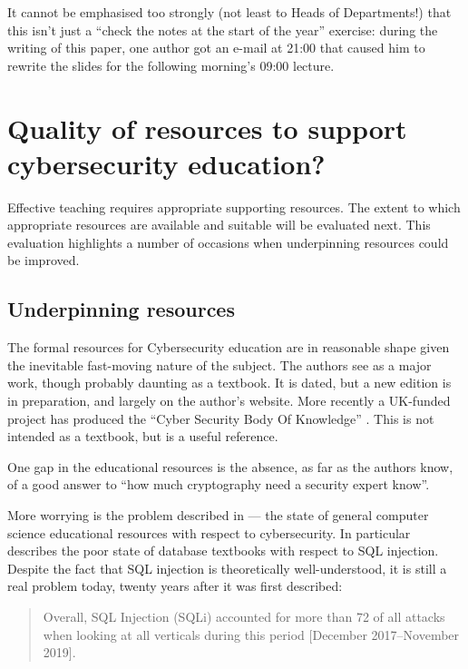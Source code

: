 \documentclass[conference]{IEEEtran}
\begin{document}
It cannot be emphasised too strongly (not least to Heads of Departments!) that this isn't just a ``check the notes at the start of the year'' exercise: during the writing of this paper, one author %
got an e-mail at 21:00 that caused him to rewrite the slides for the following morning's 09:00 lecture.


\section{Quality of resources to support cybersecurity education?}
Effective teaching requires appropriate supporting resources. The extent to which appropriate resources are available and suitable will be evaluated next. This evaluation highlights a number of occasions when underpinning resources could be improved. 
\subsection{Underpinning resources}
The formal resources for Cybersecurity education are in reasonable shape given the inevitable fast-moving nature of the subject. The authors see \cite{Anderson2008} as a major work, though probably daunting as a textbook. It is dated, but a new edition is in preparation, and largely on the author's website. More recently a UK-funded project has produced the ``Cyber Security Body Of Knowledge'' \cite{Bristol2019a}. This is not intended as a textbook, but is a useful reference.

One gap in the educational resources is the absence, as far as the authors know, of a good answer to ``how much cryptography need a security expert know''. 

More worrying is the problem described in \cite[\S IV.B]{Cricketal2019} --- the state of general computer science educational resources with respect to cybersecurity. In particular \cite{Drop2019} describes the poor state of database textbooks with respect to SQL injection.  Despite the fact that SQL injection is theoretically well-understood, it is still a real problem today, twenty years after it was first described: 
\begin{quote}
Overall,
SQL Injection (SQLi) accounted for more than 72%
of all attacks when looking at all verticals during this
period [December 2017--November 2019]. \cite{Akamai2020a}
\end{quote}
\end{document}

